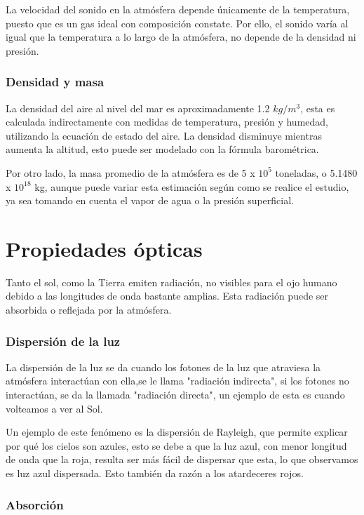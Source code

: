 \documentclass{article}
\begin{document}
La velocidad del sonido en la atmósfera depende únicamente de la temperatura, puesto que es un gas ideal con composición constate. Por ello, el sonido varía al igual que la temperatura a lo largo de la atmósfera, no depende de la densidad ni presión. 


\subsubsection {Densidad y masa}

La densidad del aire al nivel del mar es aproximadamente 1.2 $kg/m^3$, esta es calculada indirectamente con medidas de temperatura, presión y humedad, utilizando la ecuación de estado del aire. La densidad disminuye mientras aumenta la altitud, esto puede ser modelado con la fórmula barométrica.

Por otro lado, la masa promedio de la atmósfera es de 5 x $10^5$ toneladas, o 5.1480 x $10^18$ kg, aunque puede variar esta estimación según como se realice el estudio, ya sea tomando en cuenta el vapor de agua o la presión superficial.



\section{Propiedades ópticas}


Tanto el sol, como la Tierra emiten radiación, no visibles para el ojo humano debido a las longitudes de onda bastante amplias. Esta radiación puede ser absorbida o reflejada por la atmósfera. 



\subsubsection {Dispersión de la luz}

La dispersión de la luz se da cuando los fotones de la luz que atraviesa la atmósfera interactúan con ella,se le llama "radiación indirecta", si los fotones no interactúan, se da la llamada "radiación directa", un ejemplo de esta es cuando volteamos a ver al Sol. 

Un ejemplo de este fenómeno es la dispersión de Rayleigh, que permite explicar por qué los cielos son azules, esto se debe a que la luz azul, con menor longitud de onda que la roja, resulta ser más fácil de dispersar que esta, lo que observamos es luz azul dispersada. Esto también da razón a los atardeceres rojos.


\subsubsection {Absorción}
\end{document}
